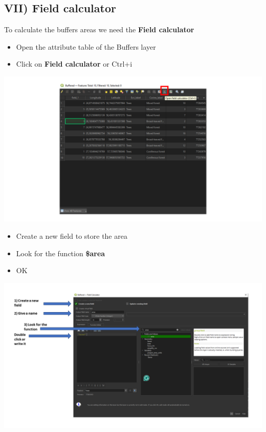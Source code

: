 \documentclass[
  letterpaper,
  DIV=11,
  numbers=noendperiod]{scrartcl}
\providecommand{\tightlist}{%
  \setlength{\itemsep}{0pt}\setlength{\parskip}{0pt}}\usepackage{longtable,booktabs,array}
\begin{document}
\hypertarget{vii-field-calculator}{%
\subsection{VII) Field calculator}\label{vii-field-calculator}}

To calculate the buffers areas we need the \textbf{Field calculator}

\begin{itemize}
\tightlist
\item
  Open the attribute table of the Buffers layer
\item
  Click on \textbf{Field calculator} or Ctrl+i
\end{itemize}

\includegraphics{Lab1/qgis_ss/QGIS_ss22.png}

\begin{itemize}
\tightlist
\item
  Create a new field to store the area
\item
  Look for the function \textbf{\$area}
\item
  OK
\end{itemize}

\includegraphics{Lab1/qgis_ss/QGIS_ss23.png}
\end{document}
